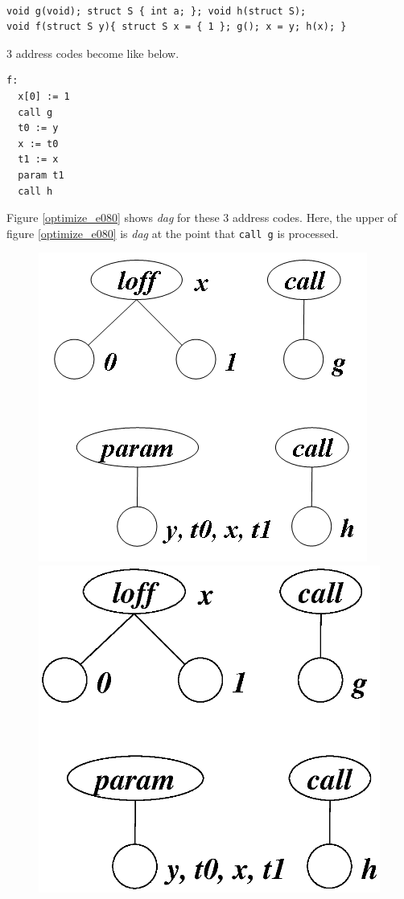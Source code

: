 \begin{Example}
\label{optimize_e079}
\begin{verbatim}

void g(void); struct S { int a; }; void h(struct S);
void f(struct S y){ struct S x = { 1 }; g(); x = y; h(x); }
\end{verbatim}
3 address codes become like below.
\begin{verbatim}
f:
  x[0] := 1
  call g
  t0 := y
  x := t0
  t1 := x
  param t1
  call h
\end{verbatim}
Figure \ref{optimize_e080} shows {\em dag} for these 3 address codes.
Here, the upper of figure \ref{optimize_e080} is {\em dag}
at the point that {\tt{call g}} is processed.
\begin{figure}[htbp]
\begin{center}
\begin{htmlonly}
\includegraphics[width=0.6\linewidth,height=0.6\linewidth]{opt033.png}
\end{htmlonly}
\begin{latexonly}
\includegraphics[width=0.6\linewidth,height=0.6\linewidth]{opt033.eps}

\end{latexonly}
\end{center}
\end{figure}
\end{Example}
